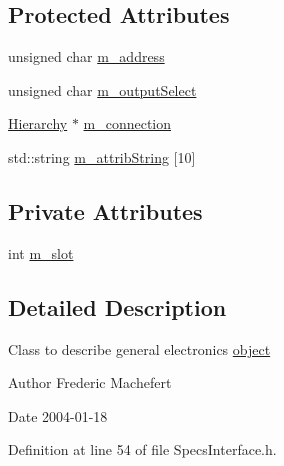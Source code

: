 \subsection*{Protected Attributes}
\begin{DoxyCompactItemize}
\item 
unsigned char \hyperlink{classSpecsInterface_a4064da5ca6e0a172363967c4acc0b365}{m\_\-address}
\item 
unsigned char \hyperlink{classSpecsInterface_a660cb4112ce1c071f277cb6ec115b411}{m\_\-outputSelect}
\item 
\hyperlink{classHierarchy}{Hierarchy} $\ast$ \hyperlink{classElement_abe3de7a5dbbc9a6dd2d7e012e5fdb266}{m\_\-connection}
\item 
std::string \hyperlink{classAttrib_a3414521d7a82476e874b25a5407b5e63}{m\_\-attribString} \mbox{[}10\mbox{]}
\end{DoxyCompactItemize}
\subsection*{Private Attributes}
\begin{DoxyCompactItemize}
\item 
int \hyperlink{classSpecsInterface_a7030d3ba54c826b3524f72e57b82ece6}{m\_\-slot}
\end{DoxyCompactItemize}


\subsection{Detailed Description}
Class to describe general electronics \hyperlink{namespaceobject}{object}

\begin{DoxyAuthor}{Author}
Frederic Machefert 
\end{DoxyAuthor}
\begin{DoxyDate}{Date}
2004-\/01-\/18 
\end{DoxyDate}


Definition at line 54 of file SpecsInterface.h.

